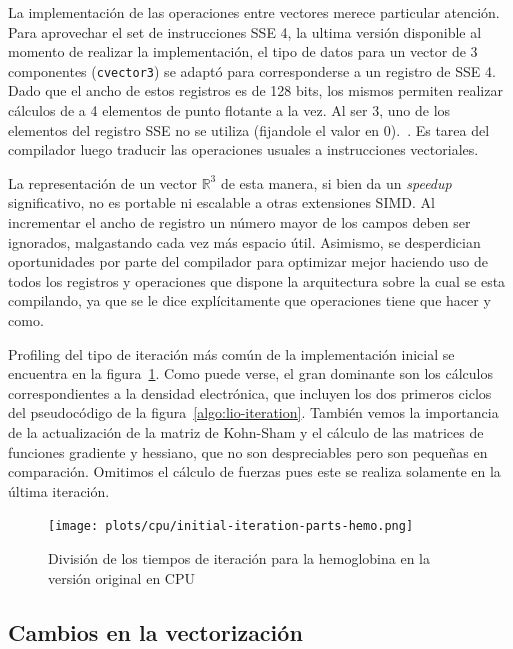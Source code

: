 La implementaci\'on de las operaciones entre vectores merece particular atenci\'on.
Para aprovechar el set de instrucciones SSE 4, la ultima versi\'on disponible al
momento de realizar la implementaci\'on, el tipo de datos para un vector de 3
componentes (\texttt{cvector3}) se adapt\'o para corresponderse a un
registro de SSE 4. Dado que el ancho de estos registros es de 128 bits, los mismos
permiten realizar c\'alculos de a 4 elementos de punto flotante a la vez. Al ser 3, uno de los
elementos del registro SSE no se utiliza (fijandole el valor en 0).~\cite{LIO}.
Es tarea del compilador luego traducir las operaciones usuales a instrucciones
vectoriales.

La representaci\'on de un vector $\mathbb{R}^3$ de esta manera, si bien da
un \textit{speedup} significativo, no es portable ni escalable a otras extensiones
SIMD. Al incrementar el ancho de registro un n\'umero mayor de los campos deben ser ignorados, malgastando cada
vez m\'as espacio \'util. Asimismo, se desperdician oportunidades por parte del compilador
para optimizar mejor haciendo uso de todos los registros y operaciones que dispone
la arquitectura sobre la cual se esta compilando, ya que se le dice expl\'icitamente
que operaciones tiene que hacer y como.

Profiling del tipo de iteraci\'on m\'as com\'un de la implementaci\'on inicial se encuentra en la figura~\ref{fig:initial-profiling}.
Como puede verse, el gran dominante son los c\'alculos correspondientes a la densidad electr\'onica,
que incluyen los dos primeros ciclos del pseudoc\'odigo de
la figura~\ref{algo:lio-iteration}. Tambi\'en vemos la importancia de
la actualizaci\'on de la matriz de Kohn-Sham y el c\'alculo de las matrices de
funciones gradiente y hessiano, que no son despreciables pero son peque\~nas en
comparaci\'on. Omitimos el c\'alculo de fuerzas pues este se realiza solamente
en la \'ultima iteraci\'on.

\begin{figure}[htbp]
   \centering
   \texttt{[image: plots/cpu/initial-iteration-parts-hemo.png]}
   \caption{Divisi\'on de los tiempos de iteraci\'on para la hemoglobina en la versi\'on
   original en CPU}
   \label{fig:initial-profiling}
\end{figure}

\subsection{Cambios en la vectorizaci\'on}

